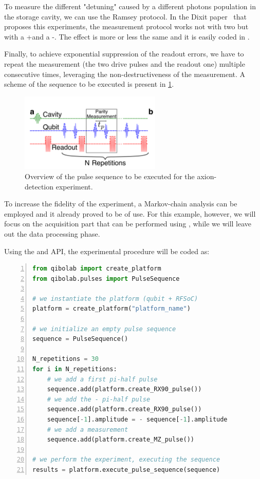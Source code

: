 To measure the different "detuning" caused by a different photons population in the storage cavity, we can use the Ramsey protocol.
In the Dixit paper~\cite{Dixit2021} that proposes this experiments, the measurement protocol works not with two \pihpulses but with a +\pihpulse and a -\pihpulse. The effect is more or less the same and it is easily coded in \Qibosoq.

Finally, to achieve exponential suppression of the readout errors, we have to repeat the measurement (the two drive pulses and the readout one) multiple consecutive times, leveraging the non-destructiveness of the measurement.
A scheme of the sequence to be executed is present in \cref{fig:dixit_sequence}.

\begin{figure}[ht]
    \centering
    \includegraphics[width=0.6\textwidth]{Other sections/figures/dixit_sequence.png}
    \caption{Overview of the pulse sequence to be executed for the axion-detection experiment.}
    \label{fig:dixit_sequence}
\end{figure}

To increase the fidelity of the experiment, a Markov-chain analysis can be employed and it already proved to be of use.
For this example, however, we will focus on the acquisition part that can be performed using \Qibosoq, while we will leave out the data processing phase.

Using the \Qibolab and \Qibosoq API, the experimental procedure  will be coded as:

\begin{lstlisting}[language=Python, numbers=left]
from qibolab import create_platform
from qibolab.pulses import PulseSequence

# we instantiate the platform (qubit + RFSoC)
platform = create_platform("platform_name")

# we initialize an empty pulse sequence
sequence = PulseSequence()

N_repetitions = 30
for i in N_repetitions:
    # we add a first pi-half pulse
    sequence.add(platform.create_RX90_pulse())
    # we add the - pi-half pulse
    sequence.add(platform.create_RX90_pulse())
    sequence[-1].amplitude = - sequence[-1].amplitude
    # we add a measurement
    sequence.add(platform.create_MZ_pulse())

# we perform the experiment, executing the sequence
results = platform.execute_pulse_sequence(sequence)
\end{lstlisting}

